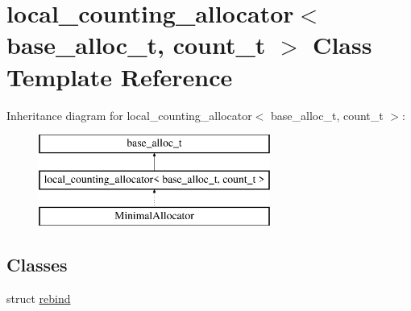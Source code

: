 \hypertarget{classlocal__counting__allocator}{}\section{local\+\_\+counting\+\_\+allocator$<$ base\+\_\+alloc\+\_\+t, count\+\_\+t $>$ Class Template Reference}
\label{classlocal__counting__allocator}
Inheritance diagram for local\+\_\+counting\+\_\+allocator$<$ base\+\_\+alloc\+\_\+t, count\+\_\+t $>$\+:\begin{figure}[H]
\begin{center}
\leavevmode
\includegraphics[height=3.000000cm]{classlocal__counting__allocator}
\end{center}
\end{figure}
\subsection*{Classes}
\begin{DoxyCompactItemize}
\item 
struct \hyperlink{structlocal__counting__allocator_1_1rebind}{rebind}
\end{DoxyCompactItemize}
